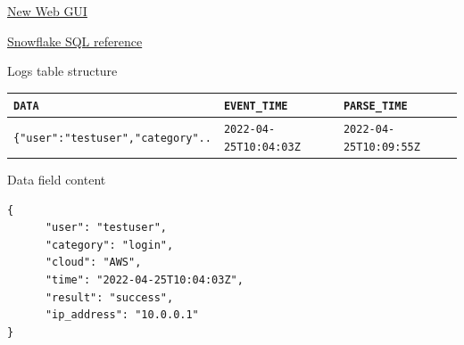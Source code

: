 \documentclass[9pt]{innovativeinnovation-cheatsheet}
\begin{document}
\begin{multicols}{3}


\be{}
      \item \href{https://app.snowflake.com/}{New Web GUI}
      \item \href{https://docs.snowflake.com/en/sql-reference-commands.html}{Snowflake SQL reference}
\ee{}

\newline
Logs table structure
\scriptsize	
\\[4pt]
\begin{tabular}{| m{16em} | m{10em}| m{10em} |}
      \hline
      \texttt{DATA} & \texttt{EVENT\_TIME} & \texttt{PARSE\_TIME}\\
      \hline
      \texttt{\{"user":"testuser","category"..} & \texttt{2022-04-25T10:04:03Z} & \texttt{2022-04-25T10:09:55Z}\\
      \hline
\end{tabular}

\small
\noindent Data field content
\scriptsize		
\\[-18pt]
\begin{lstlisting}[style=code_style]
{
      "user": "testuser",
      "category": "login",
      "cloud": "AWS",
      "time": "2022-04-25T10:04:03Z",
      "result": "success",
      "ip_address": "10.0.0.1"
}
\end{lstlisting}


\end{multicols}
\end{document}
